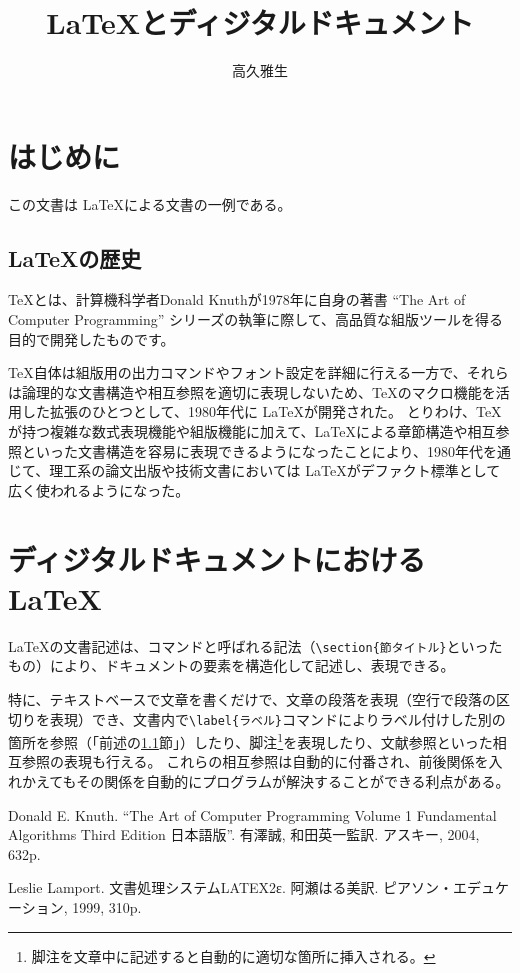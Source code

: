 \documentclass[a4j]{jarticle}
\title{\LaTeX とディジタルドキュメント}
\author{高久雅生}
\begin{document}
\maketitle

\section{はじめに}

この文書は \LaTeX による文書の一例である。

\subsection{\LaTeX の歴史}
\label{history}

\TeX とは、計算機科学者Donald Knuthが1978年に自身の著書 ``The Art of Computer Programming'' シリーズ\cite{artofcomputerprogramming}の執筆に際して、高品質な組版ツールを得る目的で開発したものです。

\TeX 自体は組版用の出力コマンドやフォント設定を詳細に行える一方で、それらは論理的な文書構造や相互参照を適切に表現しないため、\TeX のマクロ機能を活用した拡張のひとつとして、1980年代に \LaTeX が開発された。
とりわけ、\TeX が持つ複雑な数式表現機能や組版機能に加えて、\LaTeX による章節構造や相互参照といった文書構造を容易に表現できるようになったことにより、1980年代を通じて、理工系の論文出版や技術文書においては \LaTeX がデファクト標準として広く使われるようになった。

\section{ディジタルドキュメントにおける\LaTeX}

\LaTeX の文書記述は、コマンドと呼ばれる記法（{\tt \verb|\section{節タイトル}|}といったもの）により、ドキュメントの要素を構造化して記述し、表現できる。

特に、テキストベースで文章を書くだけで、文章の段落を表現（空行で段落の区切りを表現）でき、文書内で{\tt \verb|\label{ラベル}|}コマンドによりラベル付けした別の箇所を参照（「前述の\ref{history}節」）したり、脚注\footnote{脚注を文章中に記述すると自動的に適切な箇所に挿入される。}を表現したり、文献参照\cite{latex}といった相互参照の表現も行える。
これらの相互参照は自動的に付番され、前後関係を入れかえてもその関係を自動的にプログラムが解決することができる利点がある。

\begin{thebibliography}{99}
	 Donald E. Knuth. ``The Art of Computer Programming Volume 1 Fundamental Algorithms Third Edition 日本語版''. 有澤誠, 和田英一監訳. アスキー, 2004, 632p.
	 
	 Leslie Lamport. 文書処理システムLATEX2ε.  阿瀬はる美訳.  ピアソン・エデュケーション, 1999, 310p.
\end{thebibliography}
\end{document}
